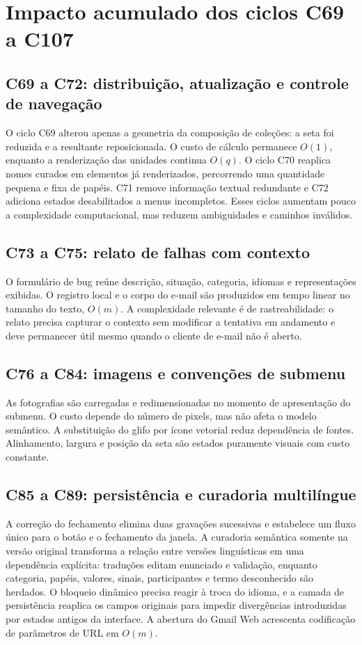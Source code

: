 \documentclass[12pt,a4paper]{article}
\begin{document}
\section{Impacto acumulado dos ciclos C69 a C107}

\subsection{C69 a C72: distribuição, atualização e controle de navegação}
O ciclo C69 alterou apenas a geometria da composição de coleções: a seta foi reduzida e a resultante reposicionada. O custo de cálculo permanece $O(1)$, enquanto a renderização das unidades continua $O(q)$. O ciclo C70 reaplica nomes curados em elementos já renderizados, percorrendo uma quantidade pequena e fixa de papéis. C71 remove informação textual redundante e C72 adiciona estados desabilitados a menus incompletos. Esses ciclos aumentam pouco a complexidade computacional, mas reduzem ambiguidades e caminhos inválidos.

\subsection{C73 a C75: relato de falhas com contexto}
O formulário de bug reúne descrição, situação, categoria, idiomas e representações exibidas. O registro local e o corpo do e-mail são produzidos em tempo linear no tamanho do texto, $O(m)$. A complexidade relevante é de rastreabilidade: o relato precisa capturar o contexto sem modificar a tentativa em andamento e deve permanecer útil mesmo quando o cliente de e-mail não é aberto.

\subsection{C76 a C84: imagens e convenções de submenu}
As fotografias são carregadas e redimensionadas no momento de apresentação do submenu. O custo depende do número de pixels, mas não afeta o modelo semântico. A substituição do glifo por ícone vetorial reduz dependência de fontes. Alinhamento, largura e posição da seta são estados puramente visuais com custo constante.

\subsection{C85 a C89: persistência e curadoria multilíngue}
A correção do fechamento elimina duas gravações sucessivas e estabelece um fluxo único para o botão e o fechamento da janela. A curadoria semântica somente na versão original transforma a relação entre versões linguísticas em uma dependência explícita: traduções editam enunciado e validação, enquanto categoria, papéis, valores, sinais, participantes e termo desconhecido são herdados. O bloqueio dinâmico precisa reagir à troca do idioma, e a camada de persistência reaplica os campos originais para impedir divergências introduzidas por estados antigos da interface. A abertura do Gmail Web acrescenta codificação de parâmetros de URL em $O(m)$.
\end{document}
